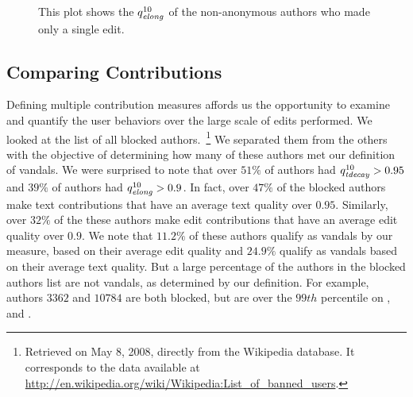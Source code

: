 \begin{figure}[tbph]
    \begin{center}
    \end{center}
    \caption[Edit quality of authors with one edit]{
        This plot shows the $\quality{elong}{10}{}$ of the
	non-anonymous authors who made only a single edit.
    }
    \label{fig-singles-quality}
\end{figure}






\subsection{Comparing Contributions}

Defining multiple contribution measures affords us
the opportunity to examine and quantify the
user behaviors over the large scale of edits performed.
We looked at the list of all blocked authors.~\footnote{Retrieved
on May 8, 2008, directly from the Wikipedia database.
It corresponds to the data available at
\url{http://en.wikipedia.org/wiki/Wikipedia:List_of_banned_users}.}
We separated them from the others with the objective of determining
how many of these authors met our definition of vandals.
We were surprised to note that over $51\%$ of authors had
$\quality{tdecay}{10}{} > 0.95$ and $39\%$ of authors had
$\quality{elong}{10}{} > 0.9$.
In fact, over $47\%$ of the blocked authors make text contributions
that have an average text quality over $0.95$.
Similarly, over $32\%$ of the these authors make edit contributions
that have an average edit quality over $0.9$.
We note that $11.2\%$ of these authors qualify as vandals by our measure,
based on their average edit quality and $24.9\%$ qualify as vandals
based on their average text quality.
But a large percentage of the authors in the blocked authors
list are not vandals, as determined by our definition.
For example, authors $3362$ and $10784$ are both blocked, but are over
the $99th$ percentile on
\editlong, \textlong and \punish.

